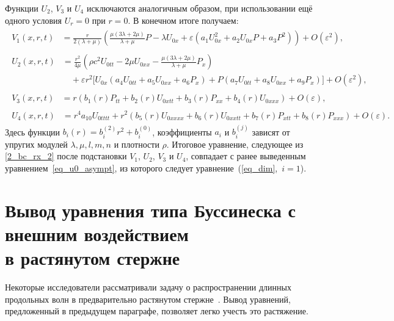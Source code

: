 \documentclass[12pt, a4paper]{report}
\begin{document}
Функции $U_2$, $V_3$ и $U_4$ исключаются аналогичным образом, при использовании ещё одного условия $U_r = 0$ при $r = 0$. В конечном итоге получаем:
\begin{align}
\begin{split}
V_1(x, r, t) &= \frac{r}{2(\lambda + \mu)} \left(\frac{ \mu(3\lambda + 2\mu)}{\lambda + \mu} P - \lambda U_{0x}  + \varepsilon (a_1 U_{0x}^2 + a_2 U_{0x} P + a_3 P^2) \right) + O(\varepsilon^2),
\end{split}\\
\begin{split}
U_2(x, r, t) &= \frac{r^2}{4\mu} \left(\rho c^2 U_{0tt} - 2\mu U_{0xx} - \frac{\mu(3\lambda + 2\mu)}{\lambda + \mu} P_x\right) \\
&\quad + \varepsilon r^2 \big[U_{0x} \left(a_4 U_{0tt} + a_5 U_{0xx} + a_6 P_x\right) + P(a_7 U_{0tt} + a_8 U_{0xx} + a_9 P_x)\big] + O(\varepsilon^2),
\end{split}\\
\begin{split}
V_3(x, r, t) &= r \left(b_1(r) P_{tt} + b_2(r) U_{0xtt} + b_3(r) P_{xx} + b_4(r) U_{0xxx}\right) + O(\varepsilon),
\end{split}\\
\begin{split}
U_4(x, r, t) &= r^4 a_{10} U_{0tttt} + r^2 \left(b_5(r) U_{0xxxx} + b_6(r) U_{0xxtt} + b_7(r) P_{xtt} + b_8(r) P_{xxx}\right) + O(\varepsilon).
\end{split}
\end{align}
Здесь функции $b_i(r) = b_{i}^{(2)}r^2 + b_{i}^{(0)}$, коэффициенты $a_i$ и $b_{i}^{(j)}$ зависят от упругих модулей $\lambda, \mu, l, m, n$ и плотности $\rho$.
Итоговое уравнение, следующее из \eqref{2_bc_rx_2} после подстановки $V_1$, $U_2$, $V_3$ и $U_4$, совпадает с ранее выведенным уравнением~\eqref{eq_u0_asympt}, из которого следует уравнение~(\ref{eq_dim},~$i=1$).


\section{Вывод уравнения типа Буссинеска с внешним воздействием \\ в растянутом стержне}
Некоторые исследователи рассматривали задачу о распространении длинных продольных волн в предварительно растянутом стержне~\cite{DF}. Вывод уравнений, предложенный в предыдущем параграфе, позволяет легко учесть это растяжение.
\end{document}
